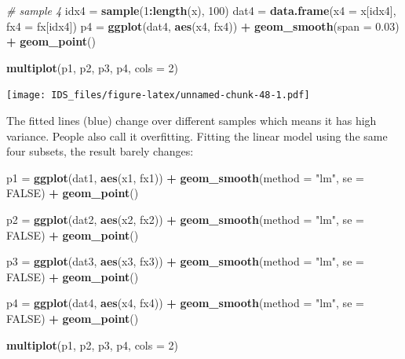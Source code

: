 \documentclass[12pt,]{krantz}
\makeatletter
\newenvironment{Shaded}{\begin{snugshade}}{\end{snugshade}}
\newcommand{\CommentTok}[1]{\textcolor[rgb]{0.37,0.37,0.37}{\textit{#1}}}
\newcommand{\DataTypeTok}[1]{\textcolor[rgb]{0.27,0.27,0.27}{#1}}
\newcommand{\DecValTok}[1]{\textcolor[rgb]{0.06,0.06,0.06}{#1}}
\newcommand{\FloatTok}[1]{\textcolor[rgb]{0.06,0.06,0.06}{#1}}
\newcommand{\KeywordTok}[1]{\textcolor[rgb]{0.27,0.27,0.27}{\textbf{#1}}}
\newcommand{\NormalTok}[1]{#1}
\newcommand{\OperatorTok}[1]{\textcolor[rgb]{0.43,0.43,0.43}{\textbf{#1}}}
\newcommand{\OtherTok}[1]{\textcolor[rgb]{0.37,0.37,0.37}{#1}}
\newcommand{\StringTok}[1]{\textcolor[rgb]{0.5,0.5,0.5}{#1}}
\newenvironment{kframe}{%
\medskip{}
\setlength{\fboxsep}{.8em}
 \def\at@end@of@kframe{}%
 \ifinner\ifhmode%
  \def\at@end@of@kframe{\end{minipage}}%
  \begin{minipage}{\columnwidth}%
 \fi\fi%
 \def\FrameCommand##1{\hskip\@totalleftmargin \hskip-\fboxsep
 \colorbox{shadecolor}{##1}\hskip-\fboxsep
     \hskip-\linewidth \hskip-\@totalleftmargin \hskip\columnwidth}%
 \MakeFramed {\advance\hsize-\width
   \@totalleftmargin\z@ \linewidth\hsize
   \@setminipage}}%
 {\par\unskip\endMakeFramed%
 \at@end@of@kframe}
\renewenvironment{Shaded}{\begin{kframe}}{\end{kframe}}
\makeatother
\begin{document}
\begin{Shaded}
\begin{Highlighting}[]
\CommentTok{# sample 4}
\NormalTok{idx4 =}\StringTok{ }\KeywordTok{sample}\NormalTok{(}\DecValTok{1}\OperatorTok{:}\KeywordTok{length}\NormalTok{(x), }\DecValTok{100}\NormalTok{)}
\NormalTok{dat4 =}\StringTok{ }\KeywordTok{data.frame}\NormalTok{(}\DataTypeTok{x4 =}\NormalTok{ x[idx4], }\DataTypeTok{fx4 =}\NormalTok{ fx[idx4])}
\NormalTok{p4 =}\StringTok{ }\KeywordTok{ggplot}\NormalTok{(dat4, }\KeywordTok{aes}\NormalTok{(x4, fx4)) }\OperatorTok{+}\StringTok{ }
\StringTok{  }\KeywordTok{geom_smooth}\NormalTok{(}\DataTypeTok{span =} \FloatTok{0.03}\NormalTok{) }\OperatorTok{+}\StringTok{ }
\StringTok{  }\KeywordTok{geom_point}\NormalTok{()}

\KeywordTok{multiplot}\NormalTok{(p1, p2, p3, p4, }\DataTypeTok{cols =} \DecValTok{2}\NormalTok{)}
\end{Highlighting}
\end{Shaded}

\texttt{[image: IDS\_files/figure-latex/unnamed-chunk-48-1.pdf]}

The fitted lines (blue) change over different samples which means it has high variance. People also call it overfitting. Fitting the linear model using the same four subsets, the result barely changes:

\begin{Shaded}
\begin{Highlighting}[]
\NormalTok{p1 =}\StringTok{ }\KeywordTok{ggplot}\NormalTok{(dat1, }\KeywordTok{aes}\NormalTok{(x1, fx1)) }\OperatorTok{+}\StringTok{ }
\StringTok{  }\KeywordTok{geom_smooth}\NormalTok{(}\DataTypeTok{method =} \StringTok{"lm"}\NormalTok{, }\DataTypeTok{se =} \OtherTok{FALSE}\NormalTok{) }\OperatorTok{+}\StringTok{ }
\StringTok{  }\KeywordTok{geom_point}\NormalTok{()}

\NormalTok{p2 =}\StringTok{ }\KeywordTok{ggplot}\NormalTok{(dat2, }\KeywordTok{aes}\NormalTok{(x2, fx2)) }\OperatorTok{+}\StringTok{ }
\StringTok{  }\KeywordTok{geom_smooth}\NormalTok{(}\DataTypeTok{method =} \StringTok{"lm"}\NormalTok{, }\DataTypeTok{se =} \OtherTok{FALSE}\NormalTok{) }\OperatorTok{+}\StringTok{ }
\StringTok{  }\KeywordTok{geom_point}\NormalTok{()}

\NormalTok{p3 =}\StringTok{ }\KeywordTok{ggplot}\NormalTok{(dat3, }\KeywordTok{aes}\NormalTok{(x3, fx3)) }\OperatorTok{+}\StringTok{ }
\StringTok{  }\KeywordTok{geom_smooth}\NormalTok{(}\DataTypeTok{method =} \StringTok{"lm"}\NormalTok{, }\DataTypeTok{se =} \OtherTok{FALSE}\NormalTok{) }\OperatorTok{+}\StringTok{ }
\StringTok{  }\KeywordTok{geom_point}\NormalTok{()}

\NormalTok{p4 =}\StringTok{ }\KeywordTok{ggplot}\NormalTok{(dat4, }\KeywordTok{aes}\NormalTok{(x4, fx4)) }\OperatorTok{+}\StringTok{ }
\StringTok{  }\KeywordTok{geom_smooth}\NormalTok{(}\DataTypeTok{method =} \StringTok{"lm"}\NormalTok{, }\DataTypeTok{se =} \OtherTok{FALSE}\NormalTok{) }\OperatorTok{+}\StringTok{ }
\StringTok{  }\KeywordTok{geom_point}\NormalTok{()}

\KeywordTok{multiplot}\NormalTok{(p1, p2, p3, p4, }\DataTypeTok{cols =} \DecValTok{2}\NormalTok{)}
\end{Highlighting}
\end{Shaded}
\end{document}
